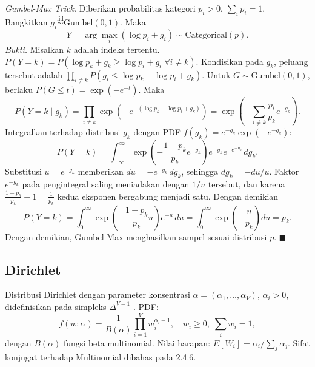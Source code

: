 \textit{Gumbel-Max Trick.} Diberikan probabilitas kategori \(p_i>0\), \(\sum_i p_i = 1\). Bangkitkan \(g_i \overset{\text{iid}}{\sim} \text{Gumbel}(0,1)\). Maka
\begin{equation}
Y = \arg\max_i \left(\log p_i + g_i\right) \sim \text{Categorical}(p).
\end{equation}
\textit{Bukti.} Misalkan \(k\) adalah indeks tertentu. \(P(Y=k) = P(\log p_k + g_k \ge \log p_i + g_i \; \forall i \neq k)\). Kondisikan pada \(g_k\), peluang tersebut adalah \(\prod_{i \neq k} P(g_i \le \log p_k - \log p_i + g_k)\). Untuk \(G \sim \text{Gumbel}(0,1)\), berlaku \(P(G \le t) = \exp(-e^{-t})\). Maka
\begin{equation}
P(Y=k \mid g_k) = \prod_{i \neq k} \exp\left(-e^{-(\log p_k - \log p_i + g_k)}\right) = \exp\left(-\sum_{i \neq k} \frac{p_i}{p_k} e^{-g_k}\right).
\end{equation}
Integralkan terhadap distribusi \(g_k\) dengan PDF \(f(g_k) = e^{-g_k} \exp(-e^{-g_k})\):
\begin{equation}
P(Y=k) = \int_{-\infty}^\infty \exp\left(-\frac{1-p_k}{p_k} e^{-g_k}\right) e^{-g_k} e^{-e^{-g_k}}\, dg_k.
\end{equation}
Substitusi \(u = e^{-g_k}\) memberikan \(du = -e^{-g_k}\,dg_k\), sehingga
\(dg_k = -du/u\). Faktor \(e^{-g_k}\) pada pengintegral saling meniadakan dengan
\(1/u\) tersebut, dan karena \(\frac{1-p_k}{p_k}+1 = \frac{1}{p_k}\) kedua
eksponen bergabung menjadi satu. Dengan demikian
\begin{equation}
P(Y=k)
= \int_0^\infty
\exp\!\left(-\frac{1-p_k}{p_k}u\right) e^{-u}\, du
= \int_0^\infty \exp\!\left(-\frac{u}{p_k}\right) du
= p_k.
\end{equation}
Dengan demikian, Gumbel-Max menghasilkan sampel sesuai distribusi \(p\). $\blacksquare$

\subsection{Dirichlet}
Distribusi Dirichlet dengan parameter konsentrasi \(\alpha = (\alpha_1,\dots,\alpha_V)\), \(\alpha_i>0\), didefinisikan pada simpleks \(\Delta^{V-1}\) \citep{moi}. PDF:
\begin{equation}
f(w;\alpha) = \frac{1}{B(\alpha)} \prod_{i=1}^V w_i^{\alpha_i - 1}, \quad w_i\ge0,\; \sum_i w_i = 1,
\end{equation}
dengan \(B(\alpha)\) fungsi beta multinomial. Nilai harapan: \(E[W_i] = \alpha_i / \sum_j \alpha_j\). Sifat konjugat terhadap Multinomial dibahas pada 2.4.6.

